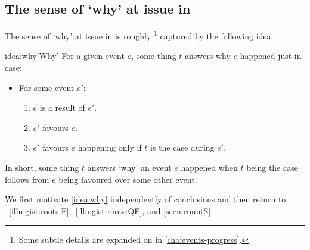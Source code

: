 \subsection{The sense of `why' at issue in \qWhy{}}


\begin{note}
  The sense of `why' at issue in \qWhy{} is roughly%
  \footnote{
    Some subtle details are expanded on in \autoref{cha:events-progress}.
  }
  captured by the following idea:

  \begin{ridea}{idea:why}{`Why'}%
    For a given event \(e\), some thing \(t\) answers why \(e\) happened just in case:
    \begin{itemize}
    \item
      For some event \(e'\):
      \begin{enumerate}[label=\Alph*., ref=\Alph*]
      \item
        \label{idea:why:result}
        \(e\) is a result of \(e'\).
      \item
        \label{idea:why:favour}
        \(e'\) favours \(e\).
      \item
        \label{idea:why:feat}
        \(e'\) favours \(e\) happening only if \(t\) is the case during \(e'\).
      \end{enumerate}
    \end{itemize}
    \vspace{-\baselineskip}
  \end{ridea}

  \noindent%
  In short, some thing \(t\) answers `why' an event \(e\) happened when \(t\) being the case follows from \(e\) being favoured over some other event.
\end{note}


\begin{note}
  We first motivate \autoref{idea:why} independently of conclusions and then return to ~\ref{illu:gist:roots:F},~\ref{illu:gist:roots:QF}, and \ref{scen:countS}.
\end{note}


